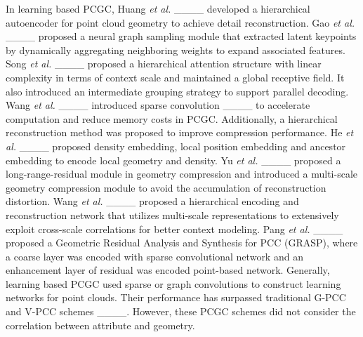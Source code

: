 In learning based PCGC,
Huang \textit{et al.} ____ developed a hierarchical autoencoder for point cloud geometry to achieve detail reconstruction. Gao \textit{et al.} ____ proposed a neural graph sampling module that extracted latent keypoints by dynamically aggregating neighboring weights to expand associated features. Song \textit{et al.} ____ proposed a hierarchical attention structure with linear complexity in terms of context scale and maintained a global receptive field. It also introduced an intermediate grouping strategy to support parallel decoding. Wang \textit{et al.} ____ introduced sparse convolution ____ to accelerate computation and reduce memory costs in PCGC. Additionally, a hierarchical reconstruction method was proposed to improve compression performance. He \textit{et al.} ____ proposed density embedding, local position embedding and ancestor embedding to encode local geometry and density. Yu \textit{et al.} ____ proposed a long-range-residual module in geometry compression and introduced a multi-scale geometry compression module to avoid the accumulation of reconstruction distortion. Wang \textit{et al.} ____ proposed a hierarchical encoding and reconstruction network that utilizes multi-scale representations to extensively exploit cross-scale correlations for better context modeling. Pang \textit{et al.} ____ proposed a Geometric Residual Analysis and Synthesis for PCC (GRASP), where a coarse layer was encoded with sparse convolutional network and an enhancement layer of residual was encoded point-based network. Generally, learning based PCGC used sparse or graph convolutions to construct learning networks for point clouds. Their performance has surpassed traditional G-PCC and V-PCC schemes ____. However, these PCGC schemes did not consider the correlation between attribute and geometry.

